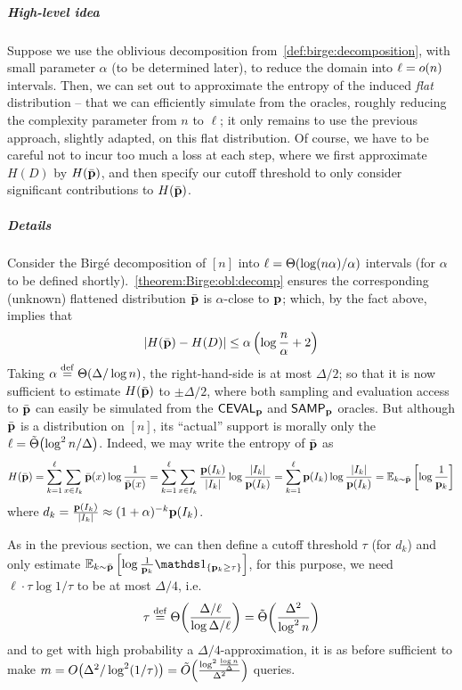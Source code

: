\subparagraph{High-level idea} Suppose we use the oblivious decomposition from~\cref{def:birge:decomposition}, with small parameter $\alpha$ (to be determined later), to reduce the domain into $\ell=\littleO{n}$ intervals. Then, we can set out to approximate the entropy of the induced \emph{flat} distribution -- that we can efficiently simulate from the \cdfsamp oracles, roughly reducing the complexity parameter from $n$ to $\ell$; it only remains to use the previous approach, slightly adapted, on this flat distribution. Of course, we have to be careful not to incur too much a loss at each step, where we first approximate $H(D)$ by $H(\bar{\mathbf{p}})$, and then specify our cutoff threshold to only consider significant contributions to $H(\bar{\mathbf{p}})$.

\subparagraph{Details} Consider the Birg\'e decomposition of $[n]$ into $\ell=\bigTheta{\log(n\alpha)/\alpha}$ intervals (for $\alpha$ to be defined shortly).~\cref{theorem:Birge:obl:decomp} ensures the corresponding (unknown) flattened distribution $\bar{\mathbf{p}}$ is $\alpha$-close to $\mathbf{p}$; which, by the fact above, implies that
\begin{equation}
  \left\lvert  H(\bar{\mathbf{p}}) - H(D)  \right\rvert \leq \alpha\left(\log\frac{n}{\alpha} + 2\right)
\end{equation}
Taking $\alpha\eqdef\bigTheta{\Delta/\log n}$, the right-hand-side is at most $\Delta/2$; so that it is now sufficient to estimate $H(\bar{\mathbf{p}})$ to $\pm\Delta/2$, where both sampling and evaluation access to $\bar{\mathbf{p}}$ can easily be simulated from the ${\sf CEVAL}_{\mathbf{p}}$ and ${\sf SAMP}_{\mathbf{p}}$ oracles. But although $\bar{\mathbf{p}}$ is a distribution on $[n]$, its ``actual'' support is morally only the $\ell=\tildeTheta{\log^2 n/\Delta}$. Indeed, we may write the entropy of $\bar{\mathbf{p}}$ as
\begin{align*}
  H(\bar{\mathbf{p}}) = \sum_{k=1}^\ell \sum_{x\in I_k} \bar{\mathbf{p}}(x) \log \frac{1}{\bar{\mathbf{p}}(x)} = \sum_{k=1}^\ell \sum_{x\in I_k} \frac{\mathbf{p}(I_k)}{\left\lvert I_k \right\rvert} \log \frac{\left\lvert I_k \right\rvert}{\mathbf{p}(I_k)}
             = \sum_{k=1}^\ell \mathbf{p}(I_k) \log \frac{\left\lvert I_k \right\rvert}{\mathbf{p}(I_k)} = \mathbb{E}_{k\sim \bar{\mathbf{p}}}\left[ \log \frac{1}{\mathbf{p}_k} \right]
\end{align*}
where $d_k=\frac{\mathbf{p}(I_k)}{\left\lvert I_k \right\rvert}\approx (1+\alpha)^{-k} \mathbf{p}(I_k)$.

  As in the previous section, we can then define a cutoff threshold $\tau$ (for $d_k$) and only estimate $\shortexpect_{k\sim \bar{\D}}\left[ \log \frac{1}{\D_k}\indic{\D_k\geq\tau} \right]$, for this purpose, we need $\ell\cdot\tau\log 1/\tau$ to be at most $\Delta/4$, i.e.
  \[
    \tau\eqdef \bigTheta{ \frac{ \Delta/\ell }{ \log\Delta/\ell } } = \tildeTheta{ \frac{\Delta^2}{\log^2 n}  }
  \]
  and to get with high probability a $\Delta/4$-approximation, it is as before sufficient to make $m=\bigO{ \Delta^2/\log^2(1/\tau) } = \tildeO{\frac{\log^2\frac{\log n}{\Delta}}{\Delta^2}}$ queries.

